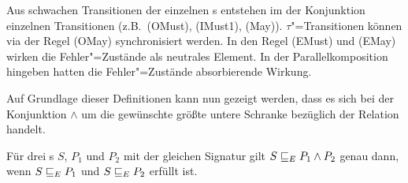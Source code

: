 Aus schwachen Transitionen der einzelnen \MEIO{}s entstehen im der Konjunktion
einzelnen Transitionen (z.B.\ (OMust), (IMust1), (May)). $\tau$"=Transitionen
können via der Regel (OMay) synchronisiert werden. In den Regel (EMust) und
(EMay) wirken die Fehler"=Zustände als neutrales Element. In der
Parallelkomposition hingeben hatten die Fehler"=Zustände absorbierende Wirkung.

Auf Grundlage dieser Definitionen kann nun gezeigt werden, dass es sich bei der
Konjunktion $\land$ um die gewünschte größte untere Schranke bezüglich der
Relation \ERel{} handelt.

\begin{Satz}[Konjunktion]
  Für drei \MEIO{}s $S$, $P_1$ und $P_2$ mit der gleichen Signatur gilt
  $S \sqsubseteq  _E P_1\land P_2$ genau dann, wenn $S \sqsubseteq  _E P_1$ und $S \sqsubseteq  _E P_2$ erfüllt
  ist.
\end{Satz}

